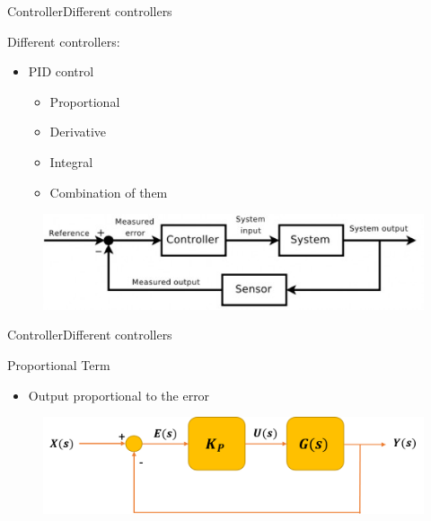 \begin{frame}{Controller}{Different controllers}
  \begin{block}{Different controllers:}

	  \begin{itemize}
	  	\item PID control
	 	\begin{itemize}
	  	\item Proportional
	  	\item Derivative
	  	\item Integral
	  	\item Combination of them
	  \end{itemize}
	  \end{itemize}


 	  \begin{figure}
        \includegraphics[scale=0.40]{../report/figures/control-theory-chart.jpg}
      \end{figure} 
  \end{block}
\end{frame}

\begin{frame}{Controller}{Different controllers}
  \begin{block}{Proportional Term}

	  \begin{itemize}
	  	\item Output proportional to the error
	  \end{itemize}

	  \begin{figure}
        \includegraphics[scale=0.26]{../report/figures/propor_controller.png}
      \end{figure}
  
  \end{block}
\end{frame}


